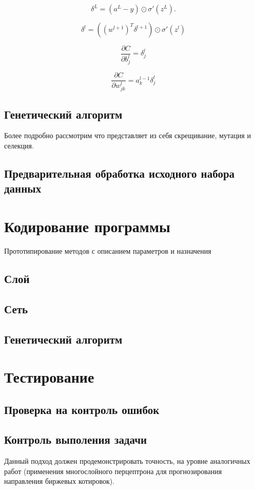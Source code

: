 \documentclass[a4paper,12pt]{article}
\begin{document}
{\large $$ \delta^L = (a^L-y) \odot \sigma'(z^L).$$}

{\large $$ \delta^l = ((w^{l+1})^T \delta^{l+1}) \odot \sigma'(z^l)$$}

{\large $$ \frac{\partial C}{\partial b^l_j} = \delta^l_j$$}

{\large $$ \frac{\partial C}{\partial w^l_{jk}} = a^{l-1}_k \delta^l_j$$}

\subsection{Генетический алгоритм}
Более подробно рассмотрим что представляет из себя скрещивание, мутация и селекция.

\subsection{Предварительная обработка исходного набора данных}

\newpage\section{Кодирование программы}
Прототипирование методов с описанием параметров и назначения

\subsection{Слой}

\subsection{Сеть}

\subsection{Генетический алгоритм}

\newpage\section{Тестирование}
\subsection{Проверка на контроль ошибок}
\subsection{Контроль выполения задачи}
Данный подход должен продемонстрировать точность, на уровне аналогичных работ (применения многослойного перцептрона для прогнозирования направления биржевых котировок).
\end{document}
